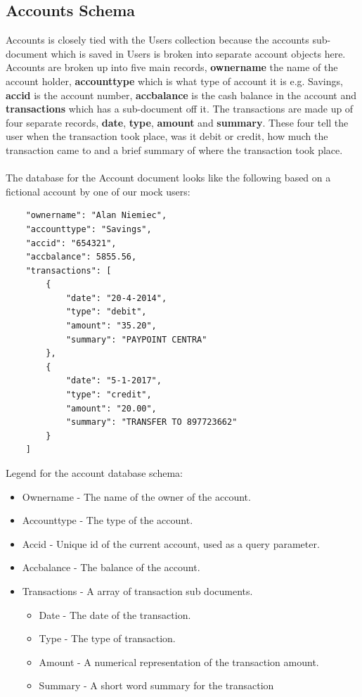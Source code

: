  \subsection{Accounts Schema}
Accounts is closely tied with the Users collection because the accounts sub-document which is saved in Users is broken into separate account objects here. Accounts are broken up into five main records, \textbf{ownername} the name of the account holder, \textbf{accounttype} which is what type of account it is e.g. Savings, \textbf{accid} is the account number, \textbf{accbalance} is the cash balance in the account and \textbf{transactions} which has a sub-document off it. The transactions are made up of four separate records, \textbf{date}, \textbf{type}, \textbf{amount} and \textbf{summary}. These four tell the user when the transaction took place, was it debit or credit, how much the transaction came to and a brief summary of where the transaction took place.\paragraph{}

The database for the Account document looks like the following based on a fictional account by one of our mock users:
\begin{verbatim}
    "ownername": "Alan Niemiec",
    "accounttype": "Savings",
    "accid": "654321",
    "accbalance": 5855.56,
    "transactions": [
        {
            "date": "20-4-2014",
            "type": "debit",
            "amount": "35.20",
            "summary": "PAYPOINT CENTRA"
        },
        {
            "date": "5-1-2017",
            "type": "credit",
            "amount": "20.00",
            "summary": "TRANSFER TO 897723662"
        }
    ]
\end{verbatim}

Legend for the account database schema:
\begin{itemize}
    \item Ownername - The name of the owner of the account.
    \item Accounttype - The type of the account.
    \item Accid - Unique id of the current account, used as a query parameter.
    \item Accbalance - The balance of the account.
    \item Transactions - A array of transaction sub documents.
        \begin{itemize}
            \item Date - The date of the transaction.
            \item Type - The type of transaction.
            \item Amount - A numerical representation of the transaction amount.
            \item Summary - A short word summary for the transaction
        \end{itemize}
\end{itemize}



